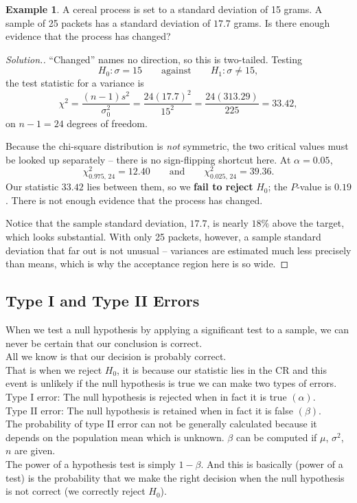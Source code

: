 \documentclass[11pt,a4paper]{article}
\theoremstyle{definition}
\newtheorem{example}[thm]{Example}
\newenvironment{solution}
  {\renewcommand{\qedsymbol}{}\begin{proof}[\textit{Solution}.]}
  {\end{proof}}
\begin{document}
\begin{example}
A cereal process is set to a standard deviation of 15 grams. A sample of 25 packets has a
standard deviation of $17.7$ grams. Is there enough evidence that the process has changed?
\end{example}

\begin{solution}
``Changed'' names no direction, so this is two-tailed. Testing
\[H_0:\sigma=15 \qquad\text{against}\qquad H_1:\sigma\neq 15,\]
the test statistic for a variance is
\[\chi^2=\frac{(n-1)s^2}{\sigma_0^2}=\frac{24(17.7)^2}{15^2}
=\frac{24(313.29)}{225}=33.42,\]
on $n-1=24$ degrees of freedom.

Because the chi-square distribution is \emph{not} symmetric, the two critical values must
be looked up separately -- there is no sign-flipping shortcut here. At $\alpha=0.05$,
\[\chi^2_{0.975,\,24}=12.40 \qquad\text{and}\qquad \chi^2_{0.025,\,24}=39.36.\]
Our statistic $33.42$ lies between them, so we \textbf{fail to reject} $H_0$; the
$P$-value is $0.19$. There is not enough evidence that the process has changed.

Notice that the sample standard deviation, $17.7$, is nearly $18\%$ above the target, which
looks substantial. With only 25 packets, however, a sample standard deviation that far out
is not unusual -- variances are estimated much less precisely than means, which is why the
acceptance region here is so wide.
\end{solution}


\subsection{Type I and Type II Errors}
When we test a null hypothesis by applying a significant test to a sample, we can never be certain that our conclusion is correct.\\ All we know is that our decision is probably correct.\\ That is when we reject $H_0$, it is because our statistic lies in the CR and this event is unlikely if the null hypothesis is true we can make two types of errors.\\[1ex]
Type I error: The null hypothesis is rejected when in fact it is true $(\alpha)$.\\[1ex]
Type II error: The null hypothesis is retained when in fact it is false $(\beta)$.\\[1ex]
The probability of type II error can not be generally calculated because it depends  on the population mean which is unknown. $\beta$ can be computed if $\mu$, $\sigma^2$, $n$ are given.\\ The power of a hypothesis test is simply $1-\beta$. And this is basically (power of a test) is  the probability that we make the right decision when the null hypothesis is not correct (we correctly reject $H_0$).\\[1ex]
\end{document}
